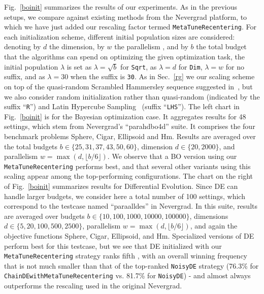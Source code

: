 Fig.~\ref{boinit} summarizes the results of our experiments. As in the previous setups, we compare against existing methods from the Nevergrad platform, to which we have just added our rescaling factor termed \texttt{MetaTuneRecentering}. For each initialization scheme,  different initial population sizes are considered: denoting by $d$ the dimension, by $w$ the  parallelism , and by $b$ the total budget that the algorithms can spend on optimizing the given optimization task, the initial population $\lambda$ is set as   
$\lambda=\sqrt{b}$ for \texttt{Sqrt}, as $\lambda=d$ for \texttt{Dim}, $\lambda=w$ for no suffix, and as $\lambda=30$ when the suffix is \texttt{30}. 
As in Sec.~\ref{rg} we  our scaling scheme on top of the quasi-random Scrambled Hammersley sequence suggested in~\cite{icmldoe}, but we also consider random initialization rather than quasi-random (indicated by the suffix ``\texttt{R}'') and Latin Hypercube Sampling~\cite{mckay} (suffix ``\texttt{LHS}''). 
The left chart in Fig.~\ref{boinit} is for the Bayesian optimization case. It aggregates results for 48 settings, which stem from Nevergrad's ``parahdbo4d'' suite. It comprises the four benchmark problems Sphere, Cigar, Ellipsoid and Hm. Results are averaged over the total budgets $b\in \{25, 31, 37, 43, 50, 60\}$, dimension $d\in\{20,2000\}$, and parallelism $w=\max(d,\lfloor b/6\rfloor)$.  
We observe that a BO version using our \texttt{MetaTuneRecentering} performs best, and that several other variants using this scaling appear among the top-performing configurations. 
The chart on the right of Fig.~\ref{boinit} summarizes results for Differential Evolution. Since DE can handle larger budgets, we consider here a total number of 100 settings, which correspond to the testcase named ``paraalldes'' in Nevergrad. In this suite, results are averaged over budgets $b \in \{10, 100, 1000, 10000, 100000\}$, dimensions $d\in \{5, 20, 100, 500, 2500\}$, parallelism $w=\max(d,\lfloor b/6\rfloor)$, and again the objective functions Sphere, Cigar, Ellipsoid, and Hm.  Specialized versions of DE perform best for this testcase, but we see that DE initialized with our \texttt{MetaTuneRecentering} strategy ranks fifth , with an overall winning frequency that is not much smaller than that of the top-ranked \texttt{NoisyDE} strategy (76.3\% for \texttt{ChainDEwithMetaTuneRecentering} vs. 81.7\% for \texttt{NoisyDE}) - and almost always outperforms the rescaling used in the original Nevergrad.
